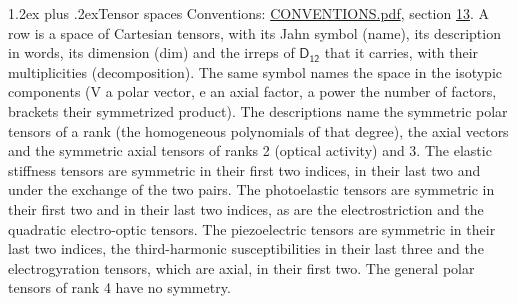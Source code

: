 \documentclass[10pt,a4paper]{article}
\makeatletter
\renewcommand\section{\@startsection{section}{1}{\z@}{-3ex plus -1ex minus -.2ex}%
  {1.2ex plus .2ex}{\normalfont\large\sffamily\bfseries\color{parttitle}}}
\numberwithin{equation}{section}
\newcommand{\grp}[1]{\mathsf{#1}}
\makeatother
\begin{document}
\section{Tensor spaces}\label{s:tensor_spaces}
Conventions: \href{../../CONVENTIONS.pdf}{CONVENTIONS.pdf}, section \href{../../CONVENTIONS.pdf\#conv.13}{13}.
\leavevmode\label{n:head.name}\label{n:head.description}\label{n:head.dim}\label{n:head.decomposition}A row is a space of Cartesian tensors, with its Jahn symbol (name), its description in words, its dimension (dim) and the irreps of $\grp{D_{12}}$ that it carries, with their multiplicities (decomposition). \label{n:label.jahn}The same symbol names the space in the isotypic components (V a polar vector, e an axial factor, a power the number of factors, brackets their symmetrized product). The descriptions name the symmetric polar tensors of a rank (the homogeneous polynomials of that degree), the axial vectors and the symmetric axial tensors of ranks 2 (optical activity) and 3. The elastic stiffness tensors are symmetric in their first two indices, in their last two and under the exchange of the two pairs. The photoelastic tensors are symmetric in their first two and in their last two indices, as are the electrostriction and the quadratic electro-optic tensors. The piezoelectric tensors are symmetric in their last two indices, the third-harmonic susceptibilities in their last three and the electrogyration tensors, which are axial, in their first two. The general polar tensors of rank 4 have no symmetry.
\end{document}
